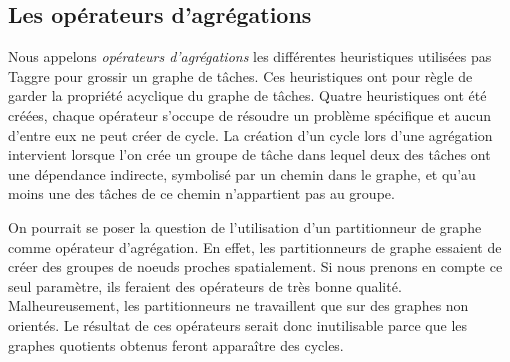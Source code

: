 \subsection{Les opérateurs d'agrégations}
Nous appelons {\em opérateurs d'agrégations} les différentes heuristiques utilisées pas Taggre pour grossir un graphe de tâches.
%
Ces heuristiques ont pour règle de garder la propriété acyclique du graphe de tâches.
%
Quatre heuristiques ont été créées, chaque opérateur s'occupe de résoudre un problème spécifique et aucun d'entre eux ne peut créer de cycle.
%
La création d'un cycle lors d'une agrégation intervient lorsque l'on crée un groupe de tâche dans lequel deux des tâches ont une dépendance indirecte, symbolisé par un chemin dans le graphe, et qu'au moins une des tâches de ce chemin n'appartient pas au groupe.

On pourrait se poser la question de l'utilisation d'un partitionneur de graphe comme opérateur d'agrégation.
%
En effet, les partitionneurs de graphe essaient de créer des groupes de noeuds proches spatialement.
%
Si nous prenons en compte ce seul paramètre, ils feraient des opérateurs de très bonne qualité.
%
Malheureusement, les partitionneurs ne travaillent que sur des graphes non orientés.
%
Le résultat de ces opérateurs serait donc inutilisable parce que les graphes quotients obtenus feront apparaître des cycles.
